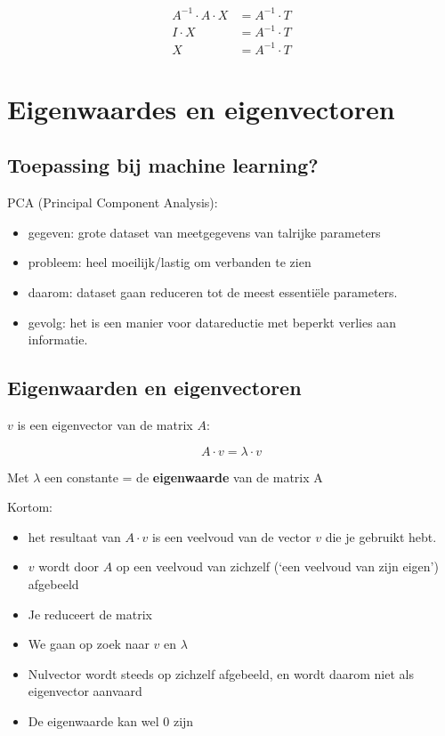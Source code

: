 \documentclass{article}
\begin{document}
\begin{align*}
    A^{-1} \cdot A \cdot X & = A^{-1}\cdot T\\
    I\cdot X & = A^{-1} \cdot T\\
    X & = A^{-1}\cdot T
\end{align*}

\section{Eigenwaardes en eigenvectoren}

\subsection{Toepassing bij machine learning?}

PCA (Principal Component Analysis):

\begin{itemize}
    \item gegeven: grote dataset van meetgegevens van talrijke parameters
    \item probleem: heel moeilijk/lastig om verbanden te zien
    \item daarom: dataset gaan reduceren tot de meest essentiële parameters.
    \item gevolg: het is een manier voor datareductie met beperkt verlies aan informatie.
\end{itemize}

\subsection{Eigenwaarden en eigenvectoren}

$v$ is een eigenvector van de matrix $A$:

\begin{equation}
    A \cdot v = \lambda \cdot v
\end{equation}

Met $\lambda$ een constante = de \textbf{eigenwaarde} van de matrix A

Kortom:

\begin{itemize}
    \item het resultaat van $A \cdot v$ is een veelvoud van de vector $v$ die je gebruikt hebt.
    \item $v$ wordt door $A$ op een veelvoud van zichzelf (`een veelvoud van zijn eigen') afgebeeld
    \item Je reduceert de matrix
    \item We gaan op zoek naar $v$ en $\lambda$
    \item Nulvector wordt steeds op zichzelf afgebeeld, en wordt daarom niet als eigenvector aanvaard
    \item De eigenwaarde kan wel $0$ zijn 
\end{itemize}
\end{document}
